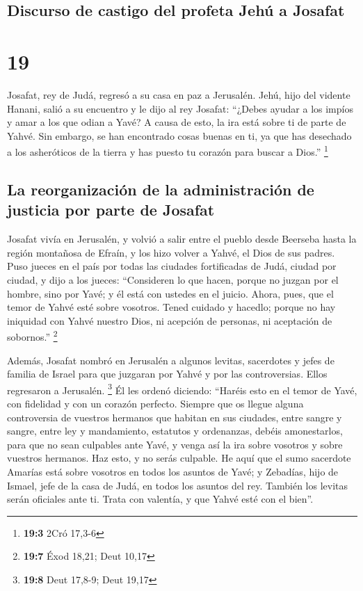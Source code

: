 \hypertarget{discurso-de-castigo-del-profeta-jehuxfa-a-josafat}{%
\subsection{Discurso de castigo del profeta Jehú a
Josafat}\label{discurso-de-castigo-del-profeta-jehuxfa-a-josafat}}

\hypertarget{section-18}{%
\section{19}\label{section-18}}

 Josafat, rey de Judá, regresó a su casa en paz a
Jerusalén.  Jehú, hijo del vidente Hanani, salió a su
encuentro y le dijo al rey Josafat: ``¿Debes ayudar a los impíos y amar
a los que odian a Yavé? A causa de esto, la ira está sobre ti de parte
de Yahvé.  Sin embargo, se han encontrado cosas buenas en
ti, ya que has desechado a los asheróticos de la tierra y has puesto tu
corazón para buscar a Dios.'' \footnote{\textbf{19:3} 2Cró 17,3-6}

\hypertarget{la-reorganizaciuxf3n-de-la-administraciuxf3n-de-justicia-por-parte-de-josafat}{%
\subsection{La reorganización de la administración de justicia por parte
de
Josafat}\label{la-reorganizaciuxf3n-de-la-administraciuxf3n-de-justicia-por-parte-de-josafat}}

 Josafat vivía en Jerusalén, y volvió a salir entre el
pueblo desde Beerseba hasta la región montañosa de Efraín, y los hizo
volver a Yahvé, el Dios de sus padres.  Puso jueces en el
país por todas las ciudades fortificadas de Judá, ciudad por ciudad,
 y dijo a los jueces: ``Consideren lo que hacen, porque no
juzgan por el hombre, sino por Yavé; y él está con ustedes en el juicio.
 Ahora, pues, que el temor de Yahvé esté sobre vosotros.
Tened cuidado y hacedlo; porque no hay iniquidad con Yahvé nuestro Dios,
ni acepción de personas, ni aceptación de sobornos.'' \footnote{\textbf{19:7}
  Éxod 18,21; Deut 10,17}

 Además, Josafat nombró en Jerusalén a algunos levitas,
sacerdotes y jefes de familia de Israel para que juzgaran por Yahvé y
por las controversias. Ellos regresaron a Jerusalén. \footnote{\textbf{19:8}
  Deut 17,8-9; Deut 19,17}  Él les ordenó diciendo:
``Haréis esto en el temor de Yavé, con fidelidad y con un corazón
perfecto.  Siempre que os llegue alguna controversia de
vuestros hermanos que habitan en sus ciudades, entre sangre y sangre,
entre ley y mandamiento, estatutos y ordenanzas, debéis amonestarlos,
para que no sean culpables ante Yavé, y venga así la ira sobre vosotros
y sobre vuestros hermanos. Haz esto, y no serás culpable.
 He aquí que el sumo sacerdote Amarías está sobre
vosotros en todos los asuntos de Yavé; y Zebadías, hijo de Ismael, jefe
de la casa de Judá, en todos los asuntos del rey. También los levitas
serán oficiales ante ti. Trata con valentía, y que Yahvé esté con el
bien''.

